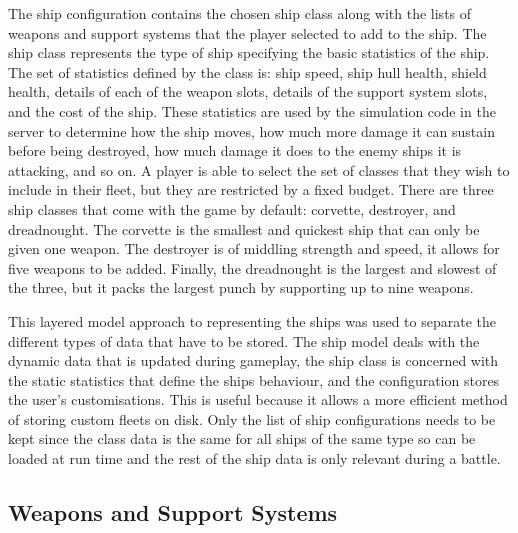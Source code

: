 The ship configuration contains the chosen ship class along with the lists of weapons and support systems that the player selected to add to the ship. The ship class represents the type of ship specifying the basic statistics of the ship. The set of statistics defined by the class is: ship speed, ship hull health, shield health, details of each of the weapon slots, details of the support system slots, and the cost of the ship. These statistics are used by the simulation code in the server to determine how the ship moves, how much more damage it can sustain before being destroyed, how much damage it does to the enemy ships it is attacking, and so on. A player is able to select the set of classes that they wish to include in their fleet, but they are restricted by a fixed budget. There are three ship classes that come with the game by default: corvette, destroyer, and dreadnought. The corvette is the smallest and quickest ship that can only be given one weapon. The destroyer is of middling strength and speed, it allows for five weapons to be added. Finally, the dreadnought is the largest and slowest of the three, but it packs the largest punch by supporting up to nine weapons.

This layered model approach to representing the ships was used to separate the different types of data that have to be stored. The ship model deals with the dynamic data that is updated during gameplay, the ship class is concerned with the static statistics that define the ships behaviour, and the configuration stores the user's customisations. This is useful because it allows a more efficient method of storing custom fleets on disk. Only the list of ship configurations needs to be kept since the class data is the same for all ships of the same type so can be loaded at run time and the rest of the ship data is only relevant during a battle.


\subsection{Weapons and Support Systems}


